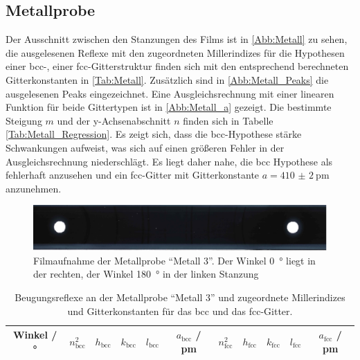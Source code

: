 \subsection{Metallprobe}
Der Ausschnitt zwischen den Stanzungen des Films ist in \autoref{Abb:Metall}
zu sehen, die ausgelesenen Reflexe mit den zugeordneten Millerindizes für die
Hypothesen einer bcc-, einer fcc-Gitterstruktur finden sich mit den entsprechend
berechneten Gitterkonstanten in \autoref{Tab:Metall}.
Zusätzlich sind in \autoref{Abb:Metall_Peaks} die ausgelesenen Peaks eingezeichnet.
Eine Ausgleichsrechnung mit einer linearen Funktion für beide Gittertypen ist in
\autoref{Abb:Metall_a} gezeigt. Die bestimmte Steigung $m$ und der y-Achsenabschnitt $n$
finden sich in Tabelle \autoref{Tab:Metall_Regression}.
Es zeigt sich, dass die bcc-Hypothese stärke Schwankungen aufweist, was
sich auf einen größeren Fehler in der Ausgleichsrechnung niederschlägt.
Es liegt daher nahe, die bcc Hypothese als fehlerhaft anzusehen und ein fcc-Gitter
mit Gitterkonstante $a=\SI{410(2)}{\pico\metre}$ anzunehmen.


\begin{figure}
  \centering
  \includegraphics[scale=0.5]{content/pics/Metall_film.pdf}
  \caption{Filmaufnahme der Metallprobe \enquote{Metall 3}. Der Winkel \SI{0}{\degree} liegt in der
  rechten, der Winkel \SI{180}{\degree} in der linken Stanzung}
  \label{Abb:Metall}
\end{figure}

\begin{table}[H]
  \centering
  \caption{Beugungsreflexe an der Metallprobe \enquote{Metall 3} und zugeordnete Millerindizes
  und Gitterkonstanten für das bcc und das fcc-Gitter.}
  \label{Tab:Metall}
  \begin{tabular}{c || c c c c c|c c c c c}
    \toprule
    Winkel / ° &
    $n_{\text{bcc}}^{2}$ &
    $h_{\text{bcc}}$ &
    $k_{\text{bcc}}$ &
    $l_{\text{bcc}}$ &
    $a_{\text{bcc}}$ / pm &
    $n_{\text{fcc}}^{2}$ &
    $h_{\text{fcc}}$ &
    $k_{\text{fcc}}$ &
    $l_{\text{fcc}}$ &
    $a_{\text{fcc}}$ / pm \\
    \midrule
    
    \bottomrule
  \end{tabular}
\end{table}

